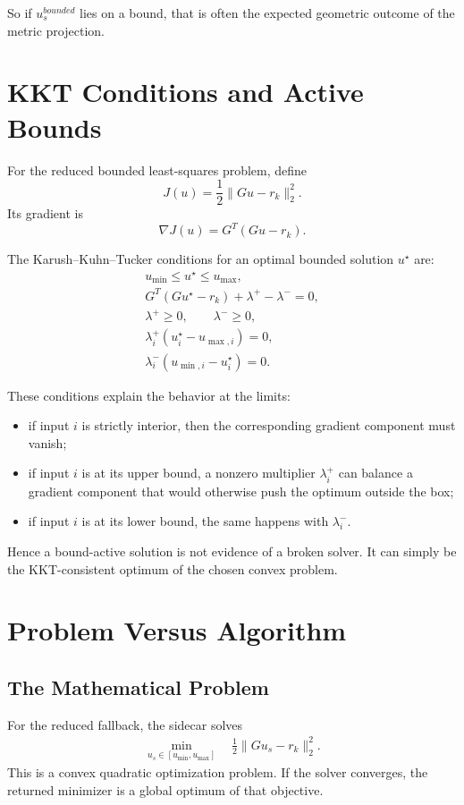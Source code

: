 \documentclass[11pt]{article}
\begin{document}
So if $u_s^{bounded}$ lies on a bound, that is often the expected geometric outcome of the metric projection.

\section{KKT Conditions and Active Bounds}

For the reduced bounded least-squares problem, define
\[
J(u) = \frac{1}{2}\|Gu-r_k\|_2^2.
\]
Its gradient is
\[
\nabla J(u) = G^T(Gu-r_k).
\]

The Karush--Kuhn--Tucker conditions for an optimal bounded solution $u^\star$ are:
\begin{align}
u_{\min} \le u^\star \le u_{\max}, \\
G^T(Gu^\star-r_k) + \lambda^+ - \lambda^- = 0, \\
\lambda^+ \ge 0,\qquad \lambda^- \ge 0, \\
\lambda_i^+(u_i^\star-u_{\max,i}) = 0, \\
\lambda_i^-(u_{\min,i}-u_i^\star) = 0.
\end{align}

These conditions explain the behavior at the limits:
\begin{itemize}
\item if input $i$ is strictly interior, then the corresponding gradient component must vanish;
\item if input $i$ is at its upper bound, a nonzero multiplier $\lambda_i^+$ can balance a gradient component that would otherwise push the optimum outside the box;
\item if input $i$ is at its lower bound, the same happens with $\lambda_i^-$.
\end{itemize}

Hence a bound-active solution is not evidence of a broken solver. It can simply be the KKT-consistent optimum of the chosen convex problem.

\section{Problem Versus Algorithm}

\subsection{The Mathematical Problem}

For the reduced fallback, the sidecar solves
\begin{align}
\min_{u_s \in [u_{\min},u_{\max}]} \quad \frac{1}{2}\|G u_s-r_k\|_2^2.
\end{align}
This is a convex quadratic optimization problem. If the solver converges, the returned minimizer is a global optimum of that objective.
\end{document}
